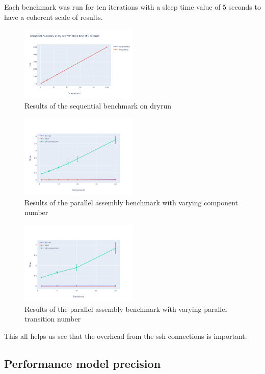 Each benchmark was run for ten iterations with a sleep time value of 5 seconds to have a coherent scale of results.





\begin{figure}[h]
  \begin{center} 
    \includegraphics[width=0.5\textwidth]{./images/evaluations_dryrun_seq.png}
    \caption{Results of the sequential benchmark on dryrun}
    \label{fig:dryrunseq}
  \end{center}
\end{figure}

\begin{figure}[h]
  \begin{center} 
    \includegraphics[width=0.5\textwidth]{./images/evaluations_par_component.pdf}
    \caption{Results of the parallel assembly benchmark with varying component number}
    \label{fig:dryrunseq}
  \end{center}
\end{figure}
\begin{figure}[h]
  \begin{center} 
    \includegraphics[width=0.5\textwidth]{./images/evaluations_par_transitions.pdf}
    \caption{Results of the parallel assembly benchmark with varying parallel transition number}
    \label{fig:dryrunseq}
  \end{center}
\end{figure}

This all helps us see that the overhead from the ssh connections is important.
\subsection{Performance model precision}


